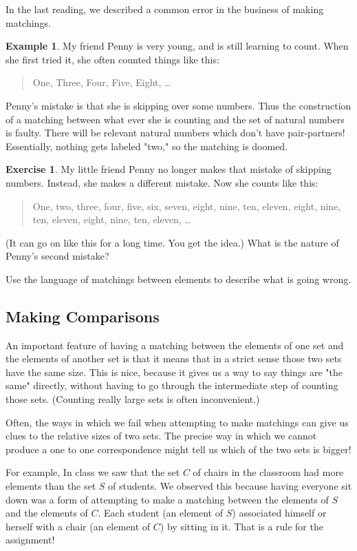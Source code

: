 \documentclass[12pt,letterpaper]{article}
\theoremstyle{definition}
\newtheorem{example}{Example}
\newtheorem{exercise}[question]{Exercise}
\begin{document}
In the last reading, we described a common error in the business of making matchings.
\begin{example}
My friend Penny is very young, and is still learning to count.
When she first tried it, she often counted things like this:
\begin{quote}
One, Three, Four, Five, Eight, \dots
\end{quote}
Penny's mistake is that she is skipping over some numbers. 
Thus the construction of a matching between what ever she is counting and the set of natural numbers is faulty.
There will be relevant natural numbers which don't have pair-partners! 
Essentially, nothing gets labeled "two," so the matching is doomed.
\end{example}

\begin{exercise}
My little friend Penny no longer makes that mistake of skipping numbers.
Instead, she makes a different mistake.
Now she counts like this:
\begin{quote}
One, two, three, four, five, six, seven, eight, nine, ten, eleven, eight, nine, ten, eleven, eight, nine, ten, eleven, \dots
\end{quote}
(It can go on like this for a long time. You get the idea.)
What is the nature of Penny's second mistake?

Use the language of matchings between elements to describe what is going wrong.
\end{exercise}

\subsection*{Making Comparisons}

An important feature of having a matching between the elements of one set and the elements of another set is that it means that in a strict sense those two sets have the same size. 
This is nice, because it gives us a way to say things are "the same" directly, without having to go through the intermediate step of counting those sets. 
(Counting really large sets is often inconvenient.)


Often, the ways in which we fail when attempting to make matchings can give us clues to the relative sizes of two sets.
The precise way in which we cannot produce a one to one correspondence might tell us which of the two sets is bigger!

For example, In class we saw that the set $C$ of chairs in the classroom had more elements than the set $S$ of students. 
We observed this because having everyone sit down was a form of attempting to make a matching between the elements of $S$ and the elements of $C$. 
Each student (an element of $S$) associated himself or herself with a chair (an element of $C$) by sitting in it. 
That is a rule for the assignment!
\end{document}

